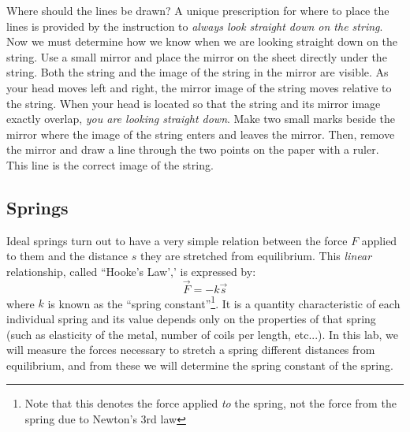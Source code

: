 Where should the lines be drawn?  A unique prescription for where to place the lines is provided by the instruction to \emph{always look straight down on the string}. Now we must determine how we know when we are looking straight down on the string. Use a small mirror and place the mirror on the sheet directly under the string. Both the string and the image of the string in the mirror are visible. As your head moves left and right, the mirror image of the string moves relative to the string. When your head is located so that the string and its mirror image exactly overlap, \emph{you are looking straight down}. Make two small marks beside the mirror where the image of the string enters and leaves the mirror. Then, remove the mirror and draw a line through the two points on the paper with a ruler. This line is the correct image of the string.

\subsection{Springs}

Ideal springs turn out to have a very simple relation between the force $F$ applied to them and the distance $s$ they are stretched from equilibrium. This \emph{linear} relationship, called ``Hooke's Law',' is expressed by:
\begin{equation}
  \vec  F = -k \vec s
\end{equation}
where $k$ is known as the ``spring constant''\footnote{Note that this denotes the force applied \emph{to} the spring, not the force from the spring due to Newton's 3rd law}. It is a quantity characteristic of each individual spring and its value depends only on the properties of that spring (such as elasticity of the metal, number of coils per length, etc...). In this lab, we will measure the forces necessary to stretch a spring different distances from equilibrium, and from these we will determine the spring constant of the spring.


